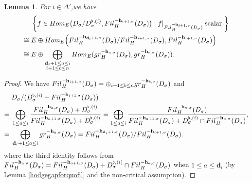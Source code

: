 \documentclass[10pt,a4paper]{amsart}
\newtheorem{lem}{Lemma}
\newcommand{\bd}{{\mathbf{d}}}
\newcommand{\bh}{{\mathbf{h}}}
\newcommand{\fil}{{\rm Fil}}
\newcommand{\gr}{{\rm gr}}
\newcommand{\homo}{{\rm Hom}}
\begin{document}
\begin{lem}\label{filforhomospace}
For $i\in \Delta'$,\;we have 
	\begin{equation*}
	\begin{aligned}
&\;\left\{f\in\homo_E\big(D_{\sigma}/D_{\sigma}^{\flat,(i)},\fil_H^{-\bh_{i+1,\sigma}}(D_{\sigma})\big):f|_{\fil_H^{-\bh_{i+1,\sigma}}(D_{\sigma})} \text{\;scalar\;}\right\}\\\cong&\; E\oplus \homo_E\Big(\fil_H^{-\bh_{\bd_i+1,\sigma}}(D_{\sigma})/\fil_H^{-\bh_{i+1,\sigma}}(D_{\sigma}),\fil_H^{-\bh_{i+1,\sigma}}(D_{\sigma})\Big)\\\cong&\;E\oplus\bigoplus_{\substack{\bd_i+1\leq a\leq i\\i+1\leq b\leq n}}\homo_E(\gr_H^{-\bh_{a,\sigma}}(D_{\sigma}),\gr_H^{-\bh_{b,\sigma}}(D_{\sigma})).\;
	\end{aligned}
\end{equation*}
\end{lem}

\begin{proof}We have $\fil_H^{-\bh_{i+1,\sigma}}(D_{\sigma})=\oplus_{i+1\leq b\leq n}\gr_H^{-\bh_{b,\sigma}}(D_{\sigma})$ and 
\begin{equation*}
\begin{aligned}
	&\;D_{\sigma}/(D_{\sigma}^{\flat,(i)}+\fil_H^{-\bh_{i+1,\sigma}}(D_{\sigma}))\\
	=&\;\bigoplus_{1\leq a\leq i}\frac{\fil_H^{-\bh_{a,\sigma}}(D_{\sigma})+D_{\sigma}^{\flat,(i)}}{\fil_H^{-\bh_{a+1,\sigma}}(D_{\sigma})+D_{\sigma}^{\flat,(i)}}=\bigoplus_{1\leq a\leq i}\frac{\fil_H^{-\bh_{a,\sigma}}(D_{\sigma})}{\fil_H^{-\bh_{a+1,\sigma}}(D_{\sigma})+D_{\sigma}^{\flat,(i)}\cap \fil_H^{-\bh_{a,\sigma}}(D_{\sigma})},\\
	=&\;\bigoplus_{\bd_i+1\leq a\leq i}\gr_H^{-\bh_{a,\sigma}}(D_{\sigma})=\fil_H^{-\bh_{\bd_i+1,\sigma}}(D_{\sigma})/\fil_H^{-\bh_{i+1,\sigma}}(D_{\sigma}).\;
\end{aligned}
\end{equation*}
where the third identity follows from ${\fil_H^{-\bh_{a,\sigma}}(D_{\sigma})=\fil_H^{-\bh_{a+1,\sigma}}(D_{\sigma})+D_{\sigma}^{\flat,(i)}\cap \fil_H^{-\bh_{a,\sigma}}}(D_{\sigma})$ when $1\leq a\leq \bd_i$ (by Lemma \ref{hodgegapforquofil} and the non-critical assumption).\;
\end{proof}
\end{document}
